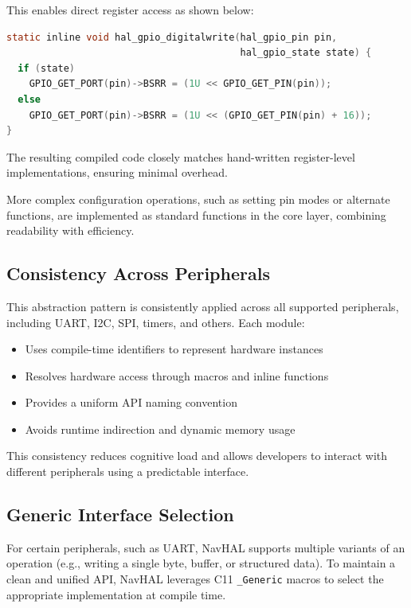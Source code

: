 This enables direct register access as shown below:

\begin{lstlisting}[language=C]
static inline void hal_gpio_digitalwrite(hal_gpio_pin pin,
                                         hal_gpio_state state) {
  if (state)
    GPIO_GET_PORT(pin)->BSRR = (1U << GPIO_GET_PIN(pin));
  else
    GPIO_GET_PORT(pin)->BSRR = (1U << (GPIO_GET_PIN(pin) + 16));
}
\end{lstlisting}

The resulting compiled code closely matches hand-written register-level implementations, ensuring minimal overhead.

More complex configuration operations, such as setting pin modes or alternate functions, are implemented as standard functions in the core layer, combining readability with efficiency.

\subsection*{Consistency Across Peripherals}

This abstraction pattern is consistently applied across all supported peripherals, including UART, I2C, SPI, timers, and others. Each module:

\begin{itemize}
    \item Uses compile-time identifiers to represent hardware instances
    \item Resolves hardware access through macros and inline functions
    \item Provides a uniform API naming convention
    \item Avoids runtime indirection and dynamic memory usage
\end{itemize}

This consistency reduces cognitive load and allows developers to interact with different peripherals using a predictable interface.

\subsection*{Generic Interface Selection}

For certain peripherals, such as UART, NavHAL supports multiple variants of an operation (e.g., writing a single byte, buffer, or structured data). To maintain a clean and unified API, NavHAL leverages C11 \texttt{\_Generic} macros to select the appropriate implementation at compile time.

